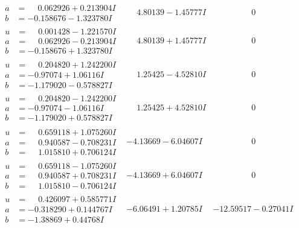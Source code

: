 \documentclass[1p]{elsarticle_modified}
\theoremstyle{definition}
\begin{document}
$$\begin{array}{c|c|c}
\begin{aligned}
a &= \phantom{-}0.062926 + 0.213904 I \\
b &= -0.158676 - 1.323780 I\end{aligned}
 & \phantom{-}4.80139 - 1.45777 I & \phantom{-0.000000 } 0 \\ \hline\begin{aligned}
u &= \phantom{-}0.001428 - 1.221570 I \\
a &= \phantom{-}0.062926 - 0.213904 I \\
b &= -0.158676 + 1.323780 I\end{aligned}
 & \phantom{-}4.80139 + 1.45777 I & \phantom{-0.000000 } 0 \\ \hline\begin{aligned}
u &= \phantom{-}0.204820 + 1.242200 I \\
a &= -0.97074 + 1.06116 I \\
b &= -1.179020 - 0.578827 I\end{aligned}
 & \phantom{-}1.25425 - 4.52810 I & \phantom{-0.000000 } 0 \\ \hline\begin{aligned}
u &= \phantom{-}0.204820 - 1.242200 I \\
a &= -0.97074 - 1.06116 I \\
b &= -1.179020 + 0.578827 I\end{aligned}
 & \phantom{-}1.25425 + 4.52810 I & \phantom{-0.000000 } 0 \\ \hline\begin{aligned}
u &= \phantom{-}0.659118 + 1.075260 I \\
a &= \phantom{-}0.940587 - 0.708231 I \\
b &= \phantom{-}1.015810 + 0.706124 I\end{aligned}
 & -4.13669 - 6.04607 I & \phantom{-0.000000 } 0 \\ \hline\begin{aligned}
u &= \phantom{-}0.659118 - 1.075260 I \\
a &= \phantom{-}0.940587 + 0.708231 I \\
b &= \phantom{-}1.015810 - 0.706124 I\end{aligned}
 & -4.13669 + 6.04607 I & \phantom{-0.000000 } 0 \\ \hline\begin{aligned}
u &= \phantom{-}0.426097 + 0.585771 I \\
a &= -0.318290 + 0.144767 I \\
b &= -1.38869 + 0.44768 I\end{aligned}
 & -6.06491 + 1.20785 I & -12.59517 - 0.27041 I \\ \hline\begin{aligned}

\end{aligned}
\end{array}$$
\end{document}
